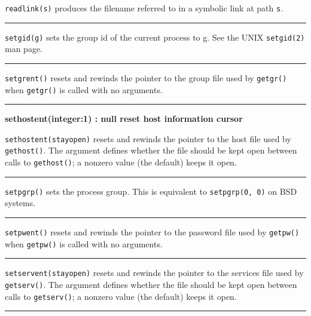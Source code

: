 \noindent
\texttt{readlink(s)} produces the filename referred to in a symbolic link
at path \texttt{s}.

\bigskip\hrule\vspace{0.1cm}

\noindent
\texttt{setgid(g)} sets the group id of the current process to g. See the UNIX
\texttt{setgid(2)} man page. 

\bigskip\hrule\vspace{0.1cm}

\noindent
\texttt{setgrent()} resets and rewinds the pointer to the group file used by
\texttt{getgr()} when \texttt{getgr()} is called with no arguments. 

\bigskip\hrule\vspace{0.1cm}
\noindent
{\bf sethostent(integer:1) : null \hfill reset host information cursor}

\noindent
\texttt{sethostent(stayopen)} resets and rewinds the pointer to the host file
used by \texttt{gethost()}. The argument defines whether the file should be kept
open between calls to \texttt{gethost()}; a nonzero value (the default) keeps it
open. 

\bigskip\hrule\vspace{0.1cm}

\noindent
\texttt{setpgrp()} sets the process group. This is equivalent to
\texttt{setpgrp(0, 0)} on BSD systems. 

\bigskip\hrule\vspace{0.1cm}

\noindent
\texttt{setpwent()} resets and rewinds the pointer to the password file used by
\texttt{getpw()} when \texttt{getpw()} is called with no arguments.

\bigskip\hrule\vspace{0.1cm}

\noindent
\texttt{setservent(stayopen)} resets and rewinds the pointer to the
services file used by \texttt{getserv()}. The argument defines whether
the file should be kept open between calls to \texttt{getserv()}; a
nonzero value (the default) keeps it open. 

\bigskip\hrule\vspace{0.1cm}

